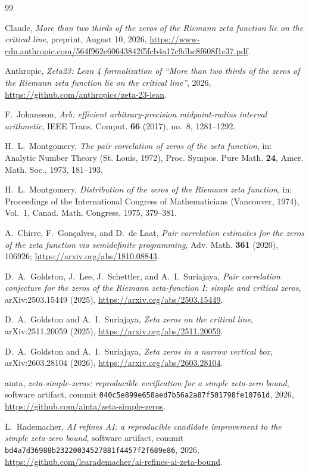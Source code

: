 \documentclass[11pt]{article}
\begin{document}
\begin{thebibliography}{99}

Claude,
\emph{More than two thirds of the zeros of the Riemann zeta function lie on
the critical line}, preprint, August 10, 2026,
\url{https://www-cdn.anthropic.com/564f962e60643842f5fcb4a17c9dbc8f608f1c37.pdf}.

Anthropic,
\emph{Zeta23: Lean 4 formalization of ``More than two thirds of the zeros of
the Riemann zeta function lie on the critical line''}, 2026,
\url{https://github.com/anthropics/zeta-23-lean}.

F.~Johansson,
\emph{Arb: efficient arbitrary-precision midpoint-radius interval
arithmetic}, IEEE Trans. Comput. \textbf{66} (2017), no.~8, 1281--1292.

H.~L.~Montgomery,
\emph{The pair correlation of zeros of the zeta function}, in: Analytic
Number Theory (St. Louis, 1972), Proc. Sympos. Pure Math. \textbf{24},
Amer. Math. Soc., 1973, 181--193.

H.~L.~Montgomery,
\emph{Distribution of the zeros of the Riemann zeta function}, in:
Proceedings of the International Congress of Mathematicians (Vancouver,
1974), Vol.~1, Canad. Math. Congress, 1975, 379--381.

A.~Chirre, F.~Gon\c{c}alves, and D.~de Laat,
\emph{Pair correlation estimates for the zeros of the zeta function via
semidefinite programming}, Adv. Math. \textbf{361} (2020), 106926;
\url{https://arxiv.org/abs/1810.08843}.

D.~A.~Goldston, J.~Lee, J.~Schettler, and A.~I.~Suriajaya,
\emph{Pair correlation conjecture for the zeros of the Riemann zeta-function
I: simple and critical zeros}, arXiv:2503.15449 (2025),
\url{https://arxiv.org/abs/2503.15449}.

D.~A.~Goldston and A.~I.~Suriajaya,
\emph{Zeta zeros on the critical line}, arXiv:2511.20059 (2025),
\url{https://arxiv.org/abs/2511.20059}.

D.~A.~Goldston and A.~I.~Suriajaya,
\emph{Zeta zeros in a narrow vertical box}, arXiv:2603.28104 (2026),
\url{https://arxiv.org/abs/2603.28104}.

ainta,
\emph{zeta-simple-zeros: reproducible verification for a simple zeta-zero
bound}, software artifact, commit
\texttt{040c5e899e658aed7b56a2a87f501798fe10761d}, 2026,
\url{https://github.com/ainta/zeta-simple-zeros}.

L.~Rademacher,
\emph{AI refines AI: a reproducible candidate improvement to the simple
zeta-zero bound}, software artifact, commit
\texttt{bd4a7d36988b23220034527881f4457f2f689e86}, 2026,
\url{https://github.com/learademacher/ai-refines-ai-zeta-bound}.

\end{thebibliography}
\end{document}
